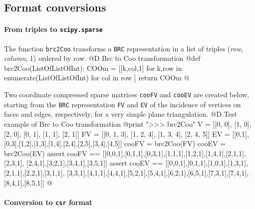 \documentclass[11pt,oneside]{article}	%
\begin{document}
\subsection{Format conversions}

\paragraph{From triples to \texttt{scipy.sparse}}
The function \texttt{brc2Coo} transforms a \texttt{BRC} representation in a list of triples (\emph{row}, \emph{column}, 1) ordered by row.
@D Brc to Coo transformation
@{def brc2Coo(ListOfListOfInt):
	COOm = [[k,col,1] for k,row in enumerate(ListOfListOfInt)
			for col in row ]
	return COOm
@}

Two coordinate compressed sparse matrices \texttt{cooFV} and \texttt{cooEV} are created below, starting from the \texttt{BRC} representation \texttt{FV} and \texttt{EV} of the incidence of vertices on faces and edges, respectively, for a very simple plane triangulation.
@D Test example of Brc to Coo transformation
@{print "\n>>> brc2Coo"
V = [[0, 0], [1, 0], [2, 0], [0, 1], [1, 1], [2, 1]]
FV = [[0, 1, 3], [1, 2, 4], [1, 3, 4], [2, 4, 5]]
EV = [[0,1],[0,3],[1,2],[1,3],[1,4],[2,4],[2,5],[3,4],[4,5]]
cooFV = brc2Coo(FV)
cooEV = brc2Coo(EV)
assert cooFV == [[0,0,1],[0,1,1],[0,3,1],[1,1,1],[1,2,1],[1,4,1],[2,1,1],
[2,3,1], [2,4,1],[3,2,1],[3,4,1],[3,5,1]]
assert cooEV == [[0,0,1],[0,1,1],[1,0,1],[1,3,1],[2,1,1],[2,2,1],[3,1,1],
[3,3,1],[4,1,1],[4,4,1],[5,2,1],[5,4,1],[6,2,1],[6,5,1],[7,3,1],[7,4,1],
[8,4,1],[8,5,1]]
@}
\paragraph{Conversion to \texttt{csr} format}
\end{document}
